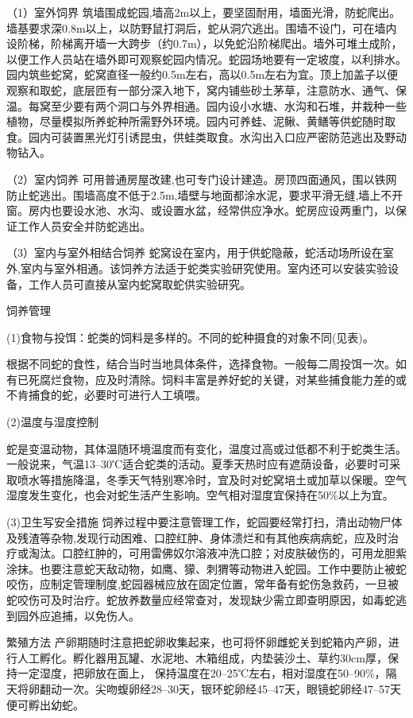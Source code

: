 \documentclass{ctexbook}
\begin{document}
（1）室外饲界 筑墙围成蛇园,墙高2m以上，要坚固耐用，墙面光滑，防蛇爬出。墙基要求深0.8m以上，以防野鼠打洞后，蛇从洞穴逃出。围墙不设门，可在墙内设阶梯，阶梯离开墙一大跨步（约0.7m），以免蛇沿阶梯爬出。墙外可堆土成阶，以便工作人员站在墙外即可观察蛇园内情况。蛇园场地要有一定坡度，以利排水。园内筑些蛇窝，蛇窝直径一般约0.5m左右，高以0.5m左右为宜。顶上加盖子以便观察和取蛇，底层匝有一部分深入地下，窝内铺些砂土茅草，注意防水、通气、保温。每窝至少要有两个洞口与外界相通。园内设小水塘、水沟和石堆，并栽种一些植物，尽量模拟所养蛇种所需野外环境。园内可养蛙、泥鳅、黄鳝等供蛇随时取食。园内可装置黑光灯引诱昆虫，供蛙类取食。水沟出入口应严密防范逃出及野动物钻入。

（2）室内饲养 可用普通房屋改建,也可专门设计建造。房顶四面通风，围以铁网防止蛇逃出。围墙高度不低于2.5m,墙壁与地面都涂水泥，要求平滑无缝,墙上不开窗。房内也要设水池、水沟、或设置水盆，经常供应净水。蛇房应设两重门，以保证工作人员安全并防蛇逃出。

（3）室内与室外相结合饲养 蛇窝设在室内，用于供蛇隐蔽，蛇活动场所设在室外,室内与室外相通。该饲养方法适于蛇类实验研究使用。室内还可以安装实验设备，工作人员可直接从室内蛇窝取蛇供实验研究。

饲养管理

(1)食物与投饵：蛇类的饲料是多样的。不同的蛇种摄食的对象不同(见表)。
	
根据不同蛇的食性，结合当时当地具体条件，选择食物。一般每二周投饵一次。如有已死腐烂食物，应及时清除。饲料丰富是养好蛇的关键，对某些捕食能力差的或不肯捕食的蛇，必要时可进行人工填喂。

(2)温度与湿度控制 

蛇是变温动物，其体温随环境温度而有变化，温度过高或过低都不利于蛇类生活。一般说来，气温13--30℃适合蛇类的活动。夏季天热时应有遮荫设备，必要时可采取喷水等措施降温，冬季天气特别寒冷时，宜及时对蛇窝培土或加草以保暖。空气湿度发生变化，也会对蛇生活产生影响。空气相对湿度宜保持在50\%以上为宜。

(3)卫生写安全措施 饲养过程中要注意管理工作，蛇园要经常打扫，清出动物尸体及残渣等杂物,发现行动困难、口腔红肿、身体溃烂和有其他疾病病蛇，应及时治疗或淘汰。口腔红肿的，可用雷佛奴尔溶液冲洗口腔；对皮肤破伤的，可用龙胆紫涂抹。也要注意蛇天敌动物，如鹰、獴、刺猬等动物进入蛇园。工作中要防止被蛇咬伤，应制定管理制度,蛇园器械应放在固定位置，常年备有蛇伤急救药，一旦被蛇咬伤可及时治疗。蛇放养数量应经常查对，发现缺少需立即查明原因，如毒蛇逃到园外应追捕，以免伤人。

繁殖方法 产卵期随时注意把蛇卵收集起来，也可将怀卵雌蛇关到蛇箱内产卵，进行人工孵化。孵化器用瓦罐、水泥地、木箱组成，内垫装沙土、草约30cm厚，保持一定湿度，把卵放在面上， 保持温度在20--25℃左右，相对湿度在50--90\%，隔天将卵翻动一次。尖吻蝮卵经28--30天，银环蛇卵经45--47天，眼镜蛇卵经47--57天便可孵出幼蛇。
\end{document}
